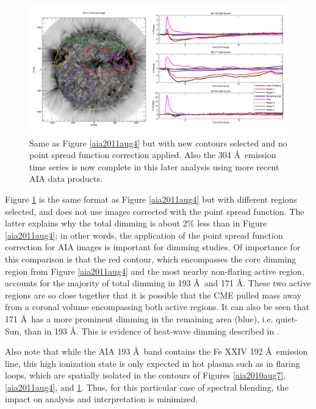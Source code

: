 \begin{figure}[!h]
    \begin{center}
	    \includegraphics[width=166mm]{Images/Aia2011Aug4NewRegions.png}
    \end{center}
    \caption[Additional AIA contour analysis for 2011 August 4 event]{
        Same as Figure \ref{aia2011aug4} but with new contours selected and no point spread function correction applied. 
        Also the 304 \AA\ emission time series is now complete in this later analysis using more recent AIA data products.  
	}
    \label{aia2011aug4newregions}
\end{figure}

Figure \ref{aia2011aug4newregions} is the same format as Figure \ref{aia2011aug4} but with different regions selected, and does not use images corrected with the point spread function. The latter explains why the total dimming is about 2\% less than in Figure \ref{aia2011aug4}; in other words, the application of the point spread function correction for AIA images is important for dimming studies. Of importance for this comparison is that the red contour, which encompasses the core dimming region from Figure \ref{aia2011aug4} and the most nearby non-flaring active region, accounts for the majority of total dimming in 193 \AA\ and 171 \AA. These two active regions are so close together that it is possible that the CME pulled mass away from a coronal volume encompassing both active regions. It can also be seen that 171 \AA\ has a more prominent dimming in the remaining area (blue), i.e. quiet-Sun, than in 193 \AA. This is evidence of heat-wave dimming described in \citet{Robbrecht2010}. 

Also note that while the AIA 193 \AA\ band contains the Fe XXIV 192 \AA\ emission line, this high ionization state is only expected in hot plasma such as in flaring loops, which are spatially isolated in the contours of Figures \ref{aia2010aug7}, \ref{aia2011aug4}, and \ref{aia2011aug4newregions}. Thus, for this particular case of spectral blending, the impact on analysis and interpretation is minimized. 

